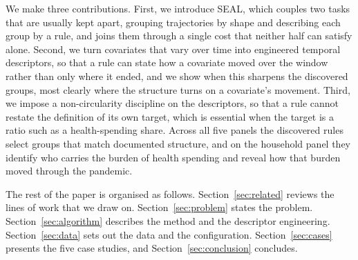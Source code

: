 We make three contributions. First, we introduce SEAL, which couples two tasks that are usually kept apart, grouping trajectories by shape and describing each group by a rule, and joins them through a single cost that neither half can satisfy alone. Second, we turn covariates that vary over time into engineered temporal descriptors, so that a rule can state how a covariate moved over the window rather than only where it ended, and we show when this sharpens the discovered groups, most clearly where the structure turns on a covariate's movement. Third, we impose a non-circularity discipline on the descriptors, so that a rule cannot restate the definition of its own target, which is essential when the target is a ratio such as a health-spending share. Across all five panels the discovered rules select groups that match documented structure, and on the household panel they identify who carries the burden of health spending and reveal how that burden moved through the pandemic.

The rest of the paper is organised as follows. Section~\ref{sec:related} reviews the lines of work that we draw on. Section~\ref{sec:problem} states the problem. Section~\ref{sec:algorithm} describes the method and the descriptor engineering. Section~\ref{sec:data} sets out the data and the configuration. Section~\ref{sec:cases} presents the five case studies, and Section~\ref{sec:conclusion} concludes.

